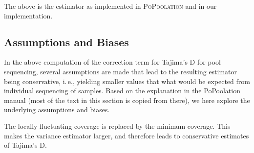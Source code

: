 \documentclass[a4paper,9pt,DIV=14]{scrartcl}
\newcounter{todo}
\newcommand\todo[1]{}
\newcommand\toolname{\textsc}
\newcommand{\ie}{i.\,e.}
\begin{document}
The above is the estimator as implemented in \toolname{PoPoolation} and in our implementation.




\subsection{Assumptions and Biases}
\label{supp:sec:TajimaD:sub:AssumptionsBiases}

\todo{Who wrote that part? I (Lucas) cannot remember it... is this all right? Do we keep it? Which document is the ``PoPoolation manual'' mentioned below? I feel like I have not seen this document yet.}
\todo{(Moi) Lucas, I think you wrote this part based on the PoPoolation repository equations PDF}

In the above computation of the correction term for Tajima's D for pool sequencing,
several assumptions are made that lead to the resulting estimator being conservative,
\ie, yielding smaller values that what would be expected from individual sequencing of samples.
Based on the explanation in the PoPoolation manual (most of the text in this section is copied from there), 
we here explore the underlying assumptions and biases.

The locally fluctuating coverage is replaced by the minimum coverage. 
This makes the variance estimator larger, and therefore leads to conservative estimates of Tajima's D.
\end{document}
